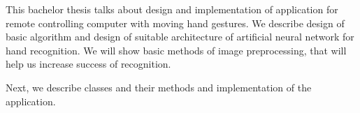 This bachelor thesis talks about design and implementation of application for remote controlling computer with moving hand gestures. We describe design of basic algorithm and design of suitable architecture of artificial neural network for hand recognition. We will show basic methods of image preprocessing, that will help us increase success of recognition.

Next, we describe classes and their methods and implementation of the application.